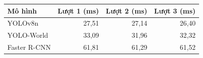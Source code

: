 \begin{tabular}{lrrr}
\toprule
Mô hình & Lượt 1 (ms) & Lượt 2 (ms) & Lượt 3 (ms) \\
\midrule
YOLOv8n & 27{,}51 & 27{,}14 & 26{,}40 \\
YOLO-World & 33{,}09 & 31{,}96 & 32{,}32 \\
Faster R-CNN & 61{,}81 & 61{,}29 & 61{,}52 \\
\bottomrule
\end{tabular}
